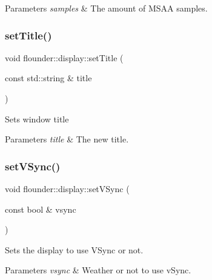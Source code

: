 \begin{DoxyParams}{Parameters}
{\em samples} & The amount of M\+S\+AA samples. \\
\hline
\end{DoxyParams}
\mbox{\label{classflounder_1_1display_a48680d3ed1b6842dea7eb5437d6c336f}} 
\subsubsection{\texorpdfstring{set\+Title()}{setTitle()}}
{\footnotesize\ttfamily void flounder\+::display\+::set\+Title (\begin{DoxyParamCaption}\item[{const std\+::string \&}]{title }\end{DoxyParamCaption})}



Sets window title 


\begin{DoxyParams}{Parameters}
{\em title} & The new title. \\
\hline
\end{DoxyParams}
\mbox{\label{classflounder_1_1display_a172501e1e99cde228d86fab59a3a636b}} 
\subsubsection{\texorpdfstring{set\+V\+Sync()}{setVSync()}}
{\footnotesize\ttfamily void flounder\+::display\+::set\+V\+Sync (\begin{DoxyParamCaption}\item[{const bool \&}]{vsync }\end{DoxyParamCaption})\hspace{0.3cm}{\ttfamily [inline]}}



Sets the display to use V\+Sync or not. 


\begin{DoxyParams}{Parameters}
{\em vsync} & Weather or not to use v\+Sync. \\
\hline
\end{DoxyParams}
\mbox{\label{classflounder_1_1display_a13edcfe35505b3e164010ed1b232e5d1}} 
